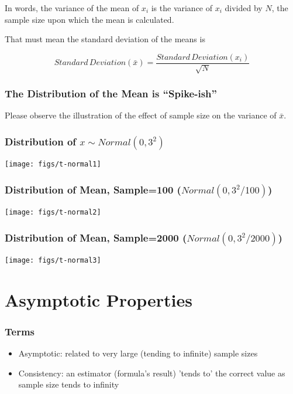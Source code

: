 \documentclass[10pt,english]{beamer}
\begin{document}
\begin{frame}
  \frametitle{}

In words, the variance of the mean of $x_{i}$ is the variance of
$x_{i}$ divided by $N$, the sample size upon which the mean is
calculated. 


That must mean the standard deviation of the means is

\[
Standard\, Deviation(\bar{x})=\frac{Standard\,
  Deviation(x_{i})}{\sqrt{N}}\]
\end{frame}

\begin{frame}
  \frametitle{The Distribution of the Mean is ``Spike-ish''}

Please observe the illustration of the effect of sample size on the
variance of $\bar{x}$.

\end{frame}




\begin{frame}

\frametitle{Distribution of $x \sim Normal(0, 3^{2})$}

\texttt{[image: figs/t-normal1]}
\end{frame}



\begin{frame}[containsverbatim]
 \frametitle{Distribution of Mean, Sample=100 ($Normal(0,3^{2}/100)$)}
\texttt{[image: figs/t-normal2]}
\end{frame}



\begin{frame}
 \frametitle{Distribution of Mean, Sample=2000 ($Normal(0,3^{2}/2000)$)}
\texttt{[image: figs/t-normal3]}
\end{frame}


\section{Asymptotic Properties}

\begin{frame}
  \frametitle{Terms}
  \begin{itemize}
  \item Asymptotic: related to very large (tending to infinite)
    sample sizes
  \item Consistency: an estimator (formula's result) 'tends to' the
    correct value as sample size tends to infinity
  \end{itemize}
\end{frame}
\end{document}

